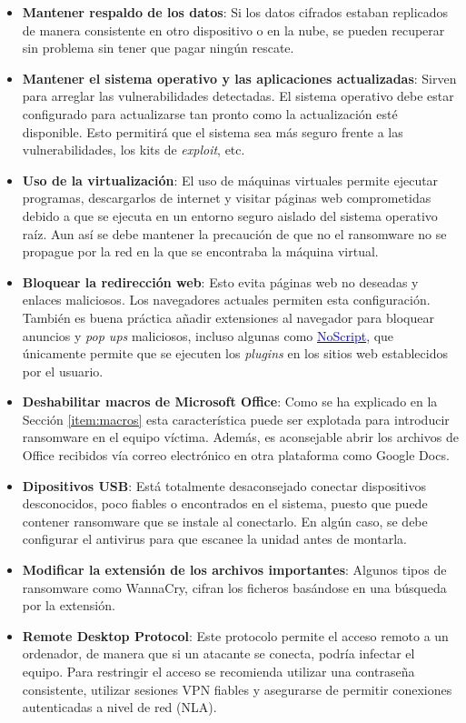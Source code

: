 \begin{itemize}
    \item \textbf{Mantener respaldo de los datos}: Si los datos cifrados estaban replicados de manera consistente en otro dispositivo o en la nube, se pueden recuperar sin problema sin tener que pagar ningún rescate.
    
    \item \textbf{Mantener el sistema operativo y las aplicaciones actualizadas}: Sirven para arreglar las vulnerabilidades detectadas. El sistema operativo debe estar configurado para actualizarse tan pronto como la actualización esté disponible. Esto permitirá que el sistema sea más seguro frente a las vulnerabilidades, los kits de \textit{exploit}, etc. 
    
    \item \textbf{Uso de la virtualización}: El uso de máquinas virtuales permite ejecutar programas, descargarlos de internet y visitar páginas web comprometidas debido a que se ejecuta en un entorno seguro aislado del sistema operativo raíz. Aun así se debe mantener la precaución de que no el ransomware no se propague por la red en la que se encontraba la máquina virtual.
    
    \item \textbf{Bloquear la redirección web}: Esto evita páginas web no deseadas y enlaces maliciosos. Los navegadores actuales permiten esta configuración. También es buena práctica añadir extensiones al navegador para bloquear anuncios y \textit{pop ups} maliciosos, incluso algunas como \href{https://noscript.net/}{\textcolor{blue}{NoScript}}, que únicamente permite que se ejecuten los \textit{plugins} en los sitios web establecidos por el usuario.
    
    \item \textbf{Deshabilitar macros de Microsoft Office}: Como se ha explicado en la Sección \ref{item:macros} esta característica puede ser explotada para introducir ransomware en el equipo víctima. Además, es aconsejable abrir los archivos de Office recibidos vía correo electrónico en otra plataforma como Google Docs.
    
    \item \textbf{Dipositivos \gls{USB}}: Está totalmente desaconsejado conectar dispositivos desconocidos, poco fiables o encontrados en el sistema, puesto que puede contener ransomware que se instale al conectarlo. En algún caso, se debe configurar el antivirus para que escanee la unidad antes de montarla.
    
    \item \textbf{Modificar la extensión de los archivos importantes}: Algunos tipos de ransomware como WannaCry, cifran los ficheros basándose en una búsqueda por la extensión.
    
    \item \textbf{Remote Desktop Protocol}: Este protocolo permite el acceso remoto a un ordenador, de manera que si un atacante se conecta, podría infectar el equipo. Para restringir el acceso se recomienda utilizar una contraseña consistente, utilizar sesiones \gls{VPN} fiables y asegurarse de permitir conexiones autenticadas a nivel de red (\gls{NLA}).
\end{itemize}

